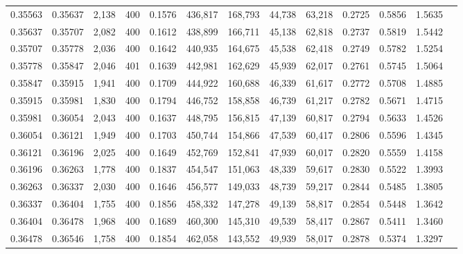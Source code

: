\begin{tabular}{rrrrrrrrrrrrr}
0.35563 & 0.35637 &  2,138 & 400 &                                     0.1576 & 436,817 & 168,793 &  44,738 &  63,218 & 0.2725 & 0.5856 & 1.5635 \\
0.35637 & 0.35707 &  2,082 & 400 &                                     0.1612 & 438,899 & 166,711 &  45,138 &  62,818 & 0.2737 & 0.5819 & 1.5442 \\
0.35707 & 0.35778 &  2,036 & 400 &                                     0.1642 & 440,935 & 164,675 &  45,538 &  62,418 & 0.2749 & 0.5782 & 1.5254 \\
0.35778 & 0.35847 &  2,046 & 401 &                                     0.1639 & 442,981 & 162,629 &  45,939 &  62,017 & 0.2761 & 0.5745 & 1.5064 \\
0.35847 & 0.35915 &  1,941 & 400 &                                     0.1709 & 444,922 & 160,688 &  46,339 &  61,617 & 0.2772 & 0.5708 & 1.4885 \\
0.35915 & 0.35981 &  1,830 & 400 &                                     0.1794 & 446,752 & 158,858 &  46,739 &  61,217 & 0.2782 & 0.5671 & 1.4715 \\
0.35981 & 0.36054 &  2,043 & 400 &                                     0.1637 & 448,795 & 156,815 &  47,139 &  60,817 & 0.2794 & 0.5633 & 1.4526 \\
0.36054 & 0.36121 &  1,949 & 400 &                                     0.1703 & 450,744 & 154,866 &  47,539 &  60,417 & 0.2806 & 0.5596 & 1.4345 \\
0.36121 & 0.36196 &  2,025 & 400 &                                     0.1649 & 452,769 & 152,841 &  47,939 &  60,017 & 0.2820 & 0.5559 & 1.4158 \\
0.36196 & 0.36263 &  1,778 & 400 &                                     0.1837 & 454,547 & 151,063 &  48,339 &  59,617 & 0.2830 & 0.5522 & 1.3993 \\
0.36263 & 0.36337 &  2,030 & 400 &                                     0.1646 & 456,577 & 149,033 &  48,739 &  59,217 & 0.2844 & 0.5485 & 1.3805 \\
0.36337 & 0.36404 &  1,755 & 400 &                                     0.1856 & 458,332 & 147,278 &  49,139 &  58,817 & 0.2854 & 0.5448 & 1.3642 \\
0.36404 & 0.36478 &  1,968 & 400 &                                     0.1689 & 460,300 & 145,310 &  49,539 &  58,417 & 0.2867 & 0.5411 & 1.3460 \\
0.36478 & 0.36546 &  1,758 & 400 &                                     0.1854 & 462,058 & 143,552 &  49,939 &  58,017 & 0.2878 & 0.5374 & 1.3297 \\

\end{tabular}

